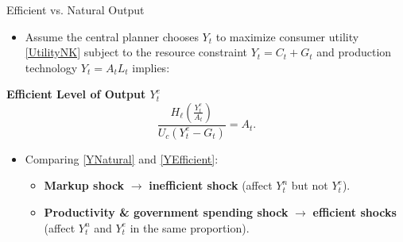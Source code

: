 \documentclass[11pt,aspectratio=169]{beamer}
\begin{document}
\begin{frame}[label=EfficientOutput]{Efficient vs. Natural Output}
\small

\begin{itemize}
  \item Assume the central planner chooses $Y_t$ to maximize consumer utility \eqref{UtilityNK} subject to the resource constraint $Y_t = C_t + G_t$ and production technology $Y_t = A_t L_t$ implies:
\end{itemize}
\textbf{Efficient Level of Output $Y_t^e$}
\begin{equation}
\frac{H_\ell\!\left(\frac{Y_t^e}{A_t}\right)}{U_c(Y_t^e - G_t)} = A_t.
\label{YEfficient}
\end{equation}

\begin{itemize}
  \item Comparing \eqref{YNatural} and \eqref{YEfficient}:
  \begin{itemize}
    \item \textbf{Markup shock} $\rightarrow$ \textbf{inefficient shock} (affect $Y_t^n$ but not $Y_t^e$).
    \item \textbf{Productivity \& government spending shock} $\rightarrow$ \textbf{efficient shocks} (affect $Y_t^n$ and $Y_t^e$ in the same proportion).
  \end{itemize}
\end{itemize}

\end{frame}
\end{document}
